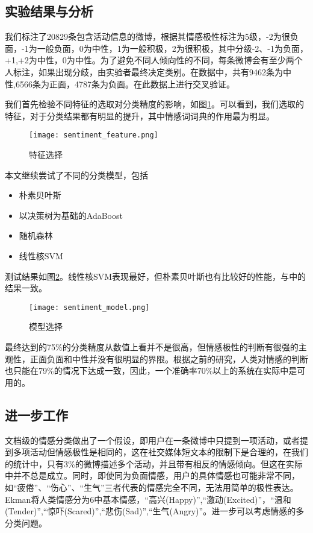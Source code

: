 \subsection{实验结果与分析}
我们标注了20829条包含活动信息的微博，根据其情感极性标注为5级，-2为很负面，-1为一般负面，0为中性，1为一般积极，2为很积极，其中分级-2、-1为负面，+1,+2为中性，0为中性。为了避免不同人倾向性的不同，每条微博会有至少两个人标注，如果出现分歧，由实验者最终决定类别。在数据中，共有9462条为中性,6566条为正面，4787条为负面。在此数据上进行交叉验证。

我们首先检验不同特征的选取对分类精度的影响，如图\ref{fig:sentiment_feature}。可以看到，我们选取的特征，对于分类结果都有明显的提升，其中情感词词典的作用最为明显。
\begin{figure}[!h]
\centering
\texttt{[image: sentiment\_feature.png]}
\caption{特征选择}
\label{fig:sentiment_feature}
\end{figure}

本文继续尝试了不同的分类模型，包括
\begin{itemize}
\item 朴素贝叶斯
\item 以决策树为基础的AdaBoost
\item 随机森林
\item 线性核SVM
\end{itemize}
测试结果如图\ref{fig:sentiment_model}。线性核SVM表现最好，但朴素贝叶斯也有比较好的性能，与\cite{pang2002thumbs}中的结果一致。

\begin{figure}[!h]
\centering
\texttt{[image: sentiment\_model.png]}
\caption{模型选择}
\label{fig:sentiment_model}
\end{figure}

最终达到的75\%的分类精度从数值上看并不是很高，但情感极性的判断有很强的主观性，正面负面和中性并没有很明显的界限。根据之前的研究，人类对情感的判断也只能在79\%的情况下达成一致，因此，一个准确率70\%以上的系统在实际中是可用的。

\subsection{进一步工作}
文档级的情感分类做出了一个假设，即用户在一条微博中只提到一项活动，或者提到多项活动但情感极性是相同的，这在社交媒体短文本的限制下是合理的，在我们的统计中，只有3\%的微博描述多个活动，并且带有相反的情感倾向。但这在实际中并不总是成立。同时，即使同为负面情感，用户的具体情感也可能非常不同，如``疲倦''、``伤心''、``生气''三者代表的情感完全不同，无法用简单的极性表达。Ekman\cite{ekman1992argument}将人类情感分为6中基本情感，``高兴(Happy)'',``激动(Excited)''，``温和(Tender)'',``惊吓(Scared)'',``悲伤(Sad)'',``生气(Angry)''。进一步可以考虑情感的多分类问题。

